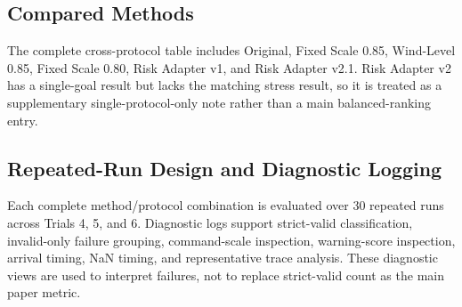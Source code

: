 \subsection{Compared Methods}

The complete cross-protocol table includes Original, Fixed Scale 0.85,
Wind-Level 0.85, Fixed Scale 0.80, Risk Adapter v1, and Risk Adapter v2.1.
Risk Adapter v2 has a single-goal result but lacks the matching stress result,
so it is treated as a supplementary single-protocol-only note rather than a
main balanced-ranking entry.

\subsection{Repeated-Run Design and Diagnostic Logging}

Each complete method/protocol combination is evaluated over 30 repeated runs
across Trials 4, 5, and 6. Diagnostic logs support strict-valid classification,
invalid-only failure grouping, command-scale inspection, warning-score
inspection, arrival timing, NaN timing, and representative trace analysis. These diagnostic
views are used to interpret failures, not to replace strict-valid count as the
main paper metric.
